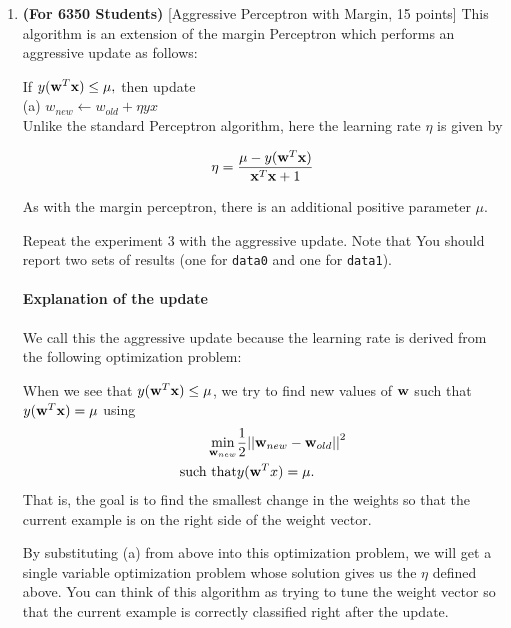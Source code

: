 \begin{enumerate}
\begin{center}
\begin{tikzpicture}[scale=0.6]
    \end{tikzpicture}
  \end{center}

\item\textbf{(For 6350 Students)} [Aggressive Perceptron with Margin,
  15 points] This algorithm is an extension of the margin Perceptron
  which performs an aggressive update as follows:

  If $y(\bw^T \bx) \leq \mu,$ then update\\
  (a) $w_{new} \leftarrow w_{old} + \eta yx$\\

  Unlike the standard Perceptron algorithm, here the learning rate
  $\eta$ is given by

  \begin{align*}
    \eta = \frac{\mu - y(\bw^T \bx) }{\bx^T \bx +1}
  \end{align*}

  As with the margin perceptron, there is an additional positive
  parameter $\mu$.

  Repeat the experiment 3 with the aggressive update. Note that You
  should report two sets of results (one for {\tt data0} and one for
  {\tt data1}).

  \paragraph{Explanation of the update} We call this the aggressive
  update because the learning rate is derived from the following
  optimization problem:

  When we see that $y(\bw^T \bx) \leq \mu$, we try to find new values
  of $\bw$ such that $y(\bw^T \bx) = \mu$ using
  \begin{eqnarray*}
    \min_{\bw_{new}} &     \frac{1}{2} {||\textbf{$\bw_{new}$} - \textbf{$\bw_{old}$}||}^2\\
    \mbox{such that} & y(\bw^T x) = \mu.
  \end{eqnarray*}
  That is, the goal is to find the smallest change in the weights so
  that the current example is on the right side of the weight vector.

  By substituting (a) from above into this optimization problem, we
  will get a single variable optimization problem whose solution gives
  us the $\eta$ defined above. You can think of this algorithm as
  trying to tune the weight vector so that the current example is
  correctly classified right after the update.
\end{enumerate}


